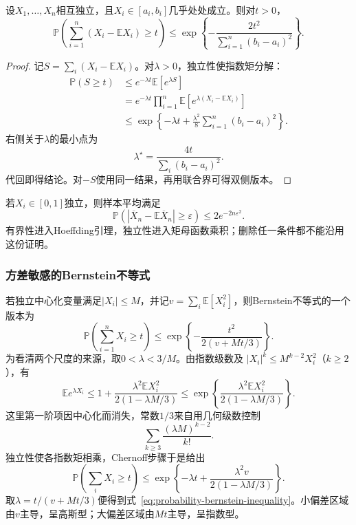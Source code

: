 \begin{theorem}[Hoeffding不等式]
\label{thm:probability-hoeffding-inequality}
设\(X_1,\ldots,X_n\)相互独立，且\(X_i\in[a_i,b_i]\)几乎处处成立。则对\(t>0\)，
\[
  \mathbb{P}\left(
    \sum_{i=1}^{n}(X_i-\mathbb{E}X_i)\geq t
  \right)
  \leq
  \exp\left\{
    -\frac{2t^2}{\sum_{i=1}^{n}(b_i-a_i)^2}
  \right\}.
\]
\end{theorem}

\begin{proof}
记\(S=\sum_i(X_i-\mathbb{E}X_i)\)。对\(\lambda>0\)，独立性使指数矩分解：
\[
\begin{aligned}
  \mathbb{P}(S\geq t)
  &\leq
  e^{-\lambda t}\mathbb{E}[e^{\lambda S}]\\
  &=
  e^{-\lambda t}
  \prod_{i=1}^{n}
  \mathbb{E}\left[
    e^{\lambda(X_i-\mathbb{E}X_i)}
  \right]\\
  &\leq
  \exp\left\{
    -\lambda t+
    \frac{\lambda^2}{8}
    \sum_{i=1}^{n}(b_i-a_i)^2
  \right\}.
\end{aligned}
\]
右侧关于\(\lambda\)的最小点为
\[ \lambda^\star
  =\frac{4t}{\sum_i(b_i-a_i)^2}. \]
代回即得结论。对\(-S\)使用同一结果，再用联合界可得双侧版本。
\end{proof}

若\(X_i\in[0,1]\)独立，则样本平均满足
\[ \mathbb{P}(|\overline{X}_n-\mathbb{E}\overline{X}_n|
  \geq\varepsilon)\leq 2e^{-2n\varepsilon^2}. \]
有界性进入Hoeffding引理，独立性进入矩母函数乘积；删除任一条件都不能沿用这份证明。

\subsubsection{方差敏感的Bernstein不等式}

若独立中心化变量满足\(|X_i|\leq M\)，并记\(v=\sum_i\mathbb{E}[X_i^2]\)，则Bernstein不等式的一个版本为
\begin{equation}
  \mathbb{P}\left(\sum_{i=1}^{n}X_i\geq t\right)
  \leq
  \exp\left\{
    -\frac{t^2}{2(v+Mt/3)}
  \right\}.
  \label{eq:probability-bernstein-inequality}
\end{equation}
为看清两个尺度的来源，取\(0<\lambda<3/M\)。由指数级数及
\(|X_i|^k\leq M^{k-2}X_i^2\)（\(k\geq2\)），有
\[
  \mathbb{E}e^{\lambda X_i}
  \leq
  1+\frac{\lambda^2\mathbb{E}X_i^2}
           {2(1-\lambda M/3)}
  \leq
  \exp\left\{
    \frac{\lambda^2\mathbb{E}X_i^2}
         {2(1-\lambda M/3)}
  \right\}.
\]
这里第一阶项因中心化而消失，常数\(1/3\)来自用几何级数控制
\[
  \sum_{k\geq3}\frac{(\lambda M)^{k-2}}{k!}.
\]
独立性使各指数矩相乘，Chernoff步骤于是给出
\[
  \mathbb{P}\left(\sum_iX_i\geq t\right)
  \leq
  \exp\left\{
    -\lambda t+\frac{\lambda^2v}
      {2(1-\lambda M/3)}
  \right\}.
\]
取\(\lambda=t/(v+Mt/3)\)便得到式~\eqref{eq:probability-bernstein-inequality}。小偏差区域由\(v\)主导，呈高斯型；大偏差区域由\(Mt\)主导，呈指数型。

